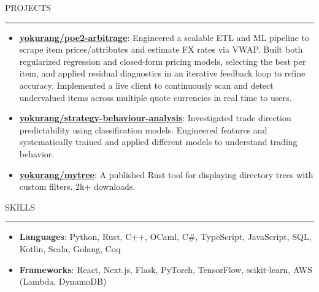 \documentclass[letterpaper, 11pt]{article}
\def\sectionlineskip{\medskip}
\def\sectionskip{\medskip}
\def \entryspacing {-0pt}
\newcommand{\SectionHeading}[1]{
  \sectionskip
  \raggedright\raggedbottom\MakeUppercase{\large{#1}}
  \sectionlineskip
  \hrule
  \color{black}
}
\newcommand{\ResumeItem}[2]{
  \item{
    \textbf{#1}{: #2 \vspace{-2.835pt}}
  }
}
\newcommand{\ResumeProjectItem}[3]{
  \item{
    \href{#2}{\textbf{#1}}{: #3 \vspace{-2.835pt}}
  }
}
\newcommand{\ResumeEntryStart}{\begin{itemize}[leftmargin=0mm, label={}]}
\newcommand{\ResumeEntryEnd}{\end{itemize}\vspace{-2.835pt}} %
\newcommand{\ProjectItemListStart}{\begin{itemize}[leftmargin=*, label=$\bullet$]}
\newcommand{\ProjectItemListEnd}{\end{itemize}\vspace{\entryspacing}}
\begin{document}
  \SectionHeading{Projects}
  \ProjectItemListStart
  \ResumeProjectItem{yokurang/poe2-arbitrage}
  {https://github.com/yokurang/path-of-elixe}
  {Engineered a scalable ETL and ML pipeline to scrape item prices/attributes and estimate FX rates via VWAP. Built both regularized regression and closed-form pricing models, selecting the best per item, and applied residual diagnostics in an iterative feedback loop to refine accuracy. Implemented a live client to continuously scan and detect undervalued items across multiple quote currencies in real time to users.}

  \ResumeProjectItem{yokurang/strategy-behaviour-analysis}
  {https://github.com/yokurang/trading-strategy-behavior-analysis}
  {Investigated trade direction predictability using classification models.
  Engineered features and systematically trained and applied different models to understand trading behavior.}


  \ResumeProjectItem{yokurang/mytree}
  {https://github.com/yokurang/mytree}
  {A published Rust tool for displaying directory trees with custom filters. 2k+ downloads.}
  \ProjectItemListEnd

  \SectionHeading{Skills}
  \ResumeEntryStart
    \ResumeItem{Languages}{ Python, Rust, C++, OCaml, C\#, TypeScript, JavaScript, SQL, Kotlin, Scala, Golang, Coq }
    \ResumeItem{Frameworks}{ React, Next.js, Flask, PyTorch, TensorFlow, scikit-learn, AWS (Lambda, DynamoDB) }
  \ResumeEntryEnd
\end{document}
